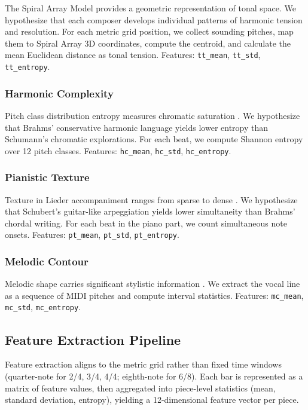 \documentclass{article}
\begin{document}
The Spiral Array Model \cite{Herremans2016,Herremans2019} provides a geometric representation of tonal space. We hypothesize that each composer develops individual patterns of harmonic tension and resolution. For each metric grid position, we collect sounding pitches, map them to Spiral Array 3D coordinates, compute the centroid, and calculate the mean Euclidean distance as tonal tension. Features: \texttt{tt\_mean}, \texttt{tt\_std}, \texttt{tt\_entropy}.

\subsubsection{Harmonic Complexity}

Pitch class distribution entropy measures chromatic saturation \cite{Kaliakatsos2011}. We hypothesize that Brahms' conservative harmonic language yields lower entropy than Schumann's chromatic explorations. For each beat, we compute Shannon entropy over 12 pitch classes. Features: \texttt{hc\_mean}, \texttt{hc\_std}, \texttt{hc\_entropy}.

\subsubsection{Pianistic Texture}

Texture in Lieder accompaniment ranges from sparse to dense \cite{Giraud2014}. We hypothesize that Schubert's guitar-like arpeggiation yields lower simultaneity than Brahms' chordal writing. For each beat in the piano part, we count simultaneous note onsets. Features: \texttt{pt\_mean}, \texttt{pt\_std}, \texttt{pt\_entropy}.

\subsubsection{Melodic Contour}

Melodic shape carries significant stylistic information \cite{Pollastri2003}. We extract the vocal line as a sequence of MIDI pitches and compute interval statistics. Features: \texttt{mc\_mean}, \texttt{mc\_std}, \texttt{mc\_entropy}.

\subsection{Feature Extraction Pipeline}

Feature extraction aligns to the metric grid rather than fixed time windows (quarter-note for 2/4, 3/4, 4/4; eighth-note for 6/8). Each bar is represented as a matrix of feature values, then aggregated into piece-level statistics (mean, standard deviation, entropy), yielding a 12-dimensional feature vector per piece.
\end{document}
